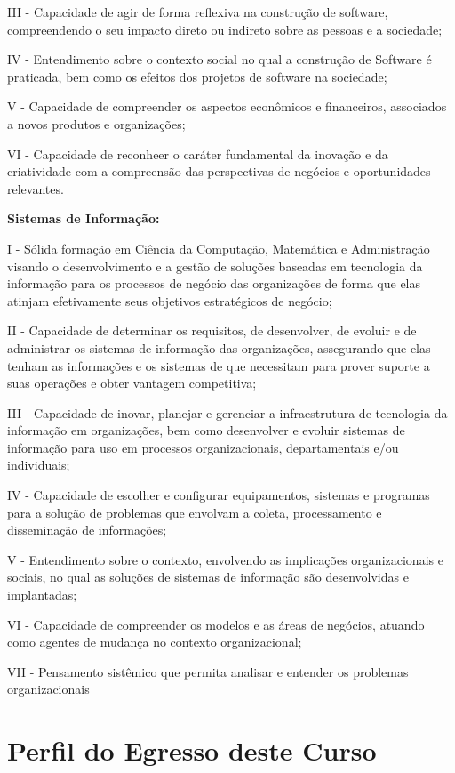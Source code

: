 III - Capacidade de agir de forma reflexiva na construção de software,
compreendendo o seu impacto direto ou indireto sobre as pessoas e a sociedade;

IV - Entendimento sobre o contexto social no qual a construção de Software é praticada, bem como os efeitos dos projetos de software na sociedade;

V - Capacidade de compreender os aspectos econômicos e financeiros, associados a novos produtos e organizações;

VI - Capacidade de reconheer o caráter fundamental da inovação e da criatividade com a compreensão das perspectivas de negócios e oportunidades relevantes.

\textbf{Sistemas de Informação:}

I - Sólida formação em Ciência da Computação, Matemática e
Administração visando o desenvolvimento e a gestão de soluções baseadas em
tecnologia da informação para os processos de negócio das organizações de forma que elas atinjam efetivamente seus objetivos estratégicos de negócio;

II - Capacidade de determinar os requisitos, de desenvolver, de evoluir e de administrar os
sistemas de informação das organizações, assegurando que elas tenham as informações
e os sistemas de que necessitam para prover suporte a suas operações e obter vantagem competitiva;

III - Capacidade de inovar, planejar e gerenciar a infraestrutura de tecnologia da informação em organizações, bem como desenvolver e evoluir sistemas de informação para uso em processos organizacionais, departamentais e/ou individuais;

IV - Capacidade de escolher e configurar equipamentos, sistemas e programas para a solução de problemas que envolvam a coleta, processamento e disseminação de informações;

V - Entendimento sobre o contexto, envolvendo as implicações organizacionais e sociais, no qual as soluções de sistemas de informação são desenvolvidas e implantadas;

VI - Capacidade de compreender os modelos e as áreas de negócios, atuando como agentes de mudança no contexto organizacional;

VII - %
Pensamento sistêmico que permita analisar e entender os problemas organizacionais

\section{Perfil do Egresso deste Curso}

